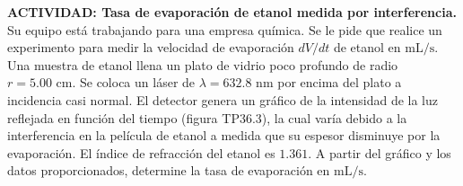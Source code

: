 \item \textbf{ACTIVIDAD: Tasa de evaporación de etanol medida por interferencia.}
Su equipo está trabajando para una empresa química. Se le pide que realice un experimento para medir la velocidad de evaporación $dV/dt$ de etanol en $\text{mL/s}$. Una muestra de etanol llena un plato de vidrio poco profundo de radio $r = 5.00\text{ cm}$. Se coloca un láser de $\lambda = 632.8\text{ nm}$ por encima del plato a incidencia casi normal. El detector genera un gráfico de la intensidad de la luz reflejada en función del tiempo (figura TP36.3), la cual varía debido a la interferencia en la película de etanol a medida que su espesor disminuye por la evaporación. El índice de refracción del etanol es $1.361$. A partir del gráfico y los datos proporcionados, determine la tasa de evaporación en $\text{mL/s}$.